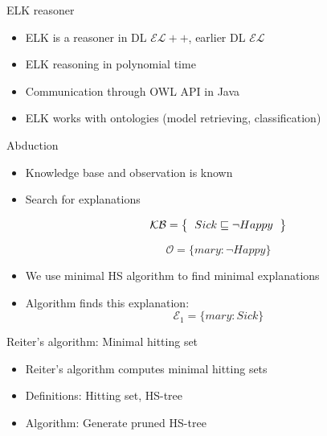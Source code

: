 \documentclass{beamer}
\begin{document}
\begin{frame}{ELK reasoner}
	\begin{itemize}
		\item {
			ELK is a reasoner in DL $\mathcal{EL{+}{+}}$, earlier DL $\mathcal{EL}$
		}
		
		\item {
			ELK reasoning in polynomial time
		}
		
		\item {
			Communication through OWL API in Java
		}
			
		\item {
			ELK works with ontologies (model retrieving, classification)
		}
	\end{itemize}
\end{frame}

\begin{frame}{Abduction}
	\begin{itemize}
		
		\item {
			Knowledge base and observation is known
		}
		
		\item {
			Search for explanations
		}
		
		\[ 
		\mathcal{KB} = \left\{
		\begin{tabular}{l c}
		$Sick \sqsubseteq \neg Happy$ \\
		\end{tabular}
		\right \}
		\]
		
		\[ \mathcal{O} = \{ mary: \neg Happy \} \]
		
		\item {
			We use minimal HS algorithm to find minimal explanations
		}
		
		\item {
			Algorithm finds this explanation: 
			\[ \mathcal{E}_{1} = \{ mary: Sick \} \]
		}
	\end{itemize}
\end{frame}

\begin{frame}{Reiter's algorithm: Minimal hitting set}
	\begin{itemize}
		
		\item {
			Reiter's algorithm computes minimal hitting sets
		}
		
		\item {
			Definitions: Hitting set, HS-tree
		}
		
		\item {
			Algorithm: Generate pruned HS-tree
		}
		
	\end{itemize}
\end{frame}
\end{document}

